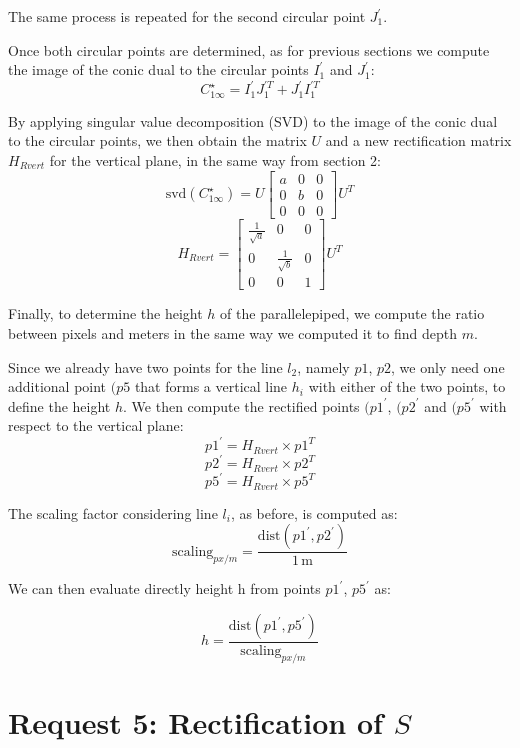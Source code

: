 \documentclass{Configuration_Files/PoliMi3i_thesis}
\begin{document}
\noindent
The same process is repeated for the second circular point \(J^{\prime}_{1}\).

\noindent
Once both circular points are determined, as for previous sections we compute the image of the conic dual to the circular points \(I^{\prime}_{1}\) and \(J^{\prime}_{1}\):
\[
C^{\star}_{1\infty} = I^{\prime}_{1} J^{\prime T}_{1} + J^{\prime}_{1} I^{\prime T}_{1}  
\]

\noindent
By applying singular value decomposition (SVD) to the image of the conic dual to the circular points, we then obtain the matrix \(U\) and a new rectification matrix $H_{Rvert}$ for the vertical plane, in the same way from section 2:
\[
\text{svd}(C^{\star}_{1\infty}) = U \begin{bmatrix} a & 0 & 0 \\ 0 & b & 0 \\ 0 & 0 & 0 \end{bmatrix} U^{T}  
\]
\[
H_{Rvert} = \begin{bmatrix} \frac{1}{\sqrt{a}} & 0 & 0 \\ 0 & \frac{1}{\sqrt{b}} & 0 \\ 0 & 0 & 1 \end{bmatrix} U^{T}  
\]

\noindent
Finally, to determine the height \(h\) of the parallelepiped, we compute the ratio between pixels and meters in the same way we computed it to find depth $m$.

\noindent
Since we already have two points for the line \(l_{2}\), namely \(p1\), \(p2\), we only need one additional point \((p5\) that forms a vertical line \(h_{i}\) with either of the two points, to define the height \(h\). We then compute the rectified points \((p1^{\prime}\), \((p2^{\prime}\) and \((p5^{\prime}\) with respect to the vertical plane:
\[
p1^{\prime} = H_{Rvert} \times p1^{T} 
\]
\[
p2^{\prime} = H_{Rvert} \times p2^{T} 
\]
\[
p5^{\prime} = H_{Rvert} \times p5^{T} 
\]

The scaling factor considering line \(l_{i}\), as before, is computed as:
\[
\text{scaling}_{px/m} = \frac{\text{dist}(p1^{\prime}, p2^{\prime})}{1\,\text{m}}  
\]

We can then evaluate directly height h from points \(p1^{\prime}\), \(p5^{\prime}\) as:

\[
h = \frac{\text{dist}(p1^{\prime}, p5^{\prime})}{\text{scaling}_{px/m}}  
\]

\newpage
\section{Request 5: Rectification of \(S\)}
\end{document}
